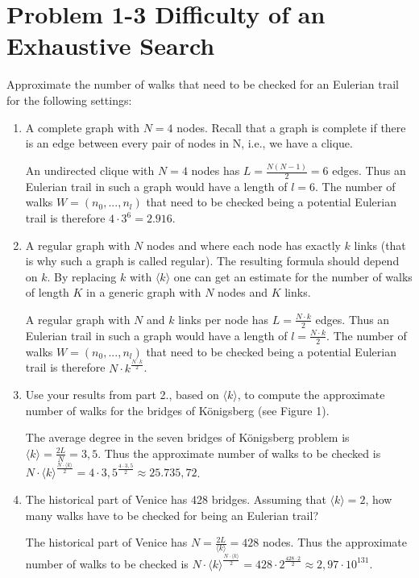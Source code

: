 \section{Problem 1-3 Difficulty of an Exhaustive Search}

Approximate the number of walks that need to be checked for an Eulerian trail for the following settings:

\begin{enumerate}
	\item A complete graph with $N=4$ nodes. Recall that a graph is complete if there is an edge between every pair of nodes in N, i.e., we have a clique.
	
	An undirected clique with $N=4$ nodes has $L=\frac{N(N-1)}{2}=6$ edges. Thus an Eulerian trail in such a graph would have a length of $l=6$. The number of walks $W=(n_0, ..., n_l)$ that need to be checked being a potential Eulerian trail is therefore $4 \cdot 3^{6}=2.916$.
	
	\item A regular graph with $N$ nodes and where each node has exactly $k$ links (that is why such a graph is called regular). The resulting formula should depend on $k$. By replacing $k$ with $\langle k \rangle$ one can get an estimate for the number of walks of length $K$ in a generic graph with $N$ nodes and $K$ links.
	
	A regular graph with $N$ and $k$ links per node has $L=\frac{N \cdot k}{2}$ edges. Thus an Eulerian trail in such a graph would have a length of $l=\frac{N \cdot k}{2}$. The number of walks $W=(n_0, ..., n_l)$ that need to be checked being a potential Eulerian trail is therefore $N \cdot k^{\frac{N \cdot k}{2}}$.
	
	\item Use your results from part 2., based on $\langle k \rangle$, to compute the approximate number of walks for the bridges of K\"onigsberg (see Figure 1).
	
	The average degree in the seven bridges of K\"onigsberg problem is $\langle k \rangle = \frac{2L}{N} = 3,5$. Thus the approximate number of walks to be checked is $N \cdot \langle k \rangle^{\frac{N \cdot \langle k \rangle}{2}} = 4 \cdot 3,5^{\frac{4 \cdot 3,5}{2}} \approx 25.735,72$.
	
	\item The historical part of Venice has 428 bridges. Assuming that $\langle k \rangle = 2$, how many walks have to be checked for being an Eulerian trail?
	
	The historical part of Venice has $N=\frac{2L}{\langle k \rangle}=428$ nodes. Thus the approximate number of walks to be checked is $N \cdot \langle k \rangle^{\frac{N \cdot \langle k \rangle}{2}} = 428 \cdot 2^{\frac{428 \cdot 2}{2}} \approx 2,97 \cdot 10^{131}$. 
	
\end{enumerate}
